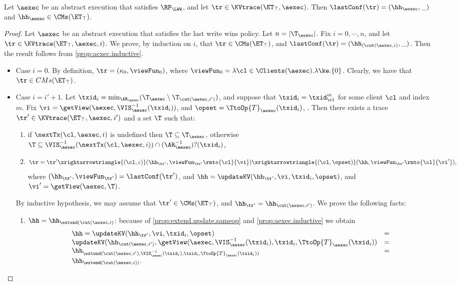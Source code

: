 \begin{proposition}
\label{prop:aexec2kvtrace}
Let $\aexec$ be an abstract execution that satisfies $\RP_{\LWW}$, 
and let $\tr \in \KVtrace(\ET_{\top}, \aexec)$. Then $\lastConf(\tr) = (\hh_{\aexec}, \_)$ and $\hh_{\aexec} \in \CMs(\ET_{\top})$. 
\end{proposition}
\begin{proof}
Let $\aexec$ be an abstract execution that satisfies the last write wins policy. 
Let $n = \lvert \T_{\aexec} \rvert$. Fix $i =0,\cdots, n$, 
and let $\tr \in \KVtrace(\ET_{\top}, \aexec, i)$. We prove, by 
induction on $i$, that $\tr \in \CMs(\ET_{\top})$, and 
$\lastConf(\tr) = (\hh_{(\cut(\aexec, i)}, \_)$. 
Then the result follows from  \cref{prop:aexec.inductive}.

\begin{itemize}
\item Case $i = 0$. By definition, $\tr = (\kappa_{0}, \viewFun_{0})$, 
where $\viewFun_{0} = \lambda \cl \in \Clients(\aexec). \lambda \ke.\{0\}$. 
Clearly, we have that $\tr \in CMs(\ET_{\top})$. 
\item Case $i = i'+1$. Let $\txid_{i} = \min_{\AR_{\aexec}}(\T_{\aexec} \setminus \T_{\cut(\aexec, i')})$, 
and suppose that $\txid_{i} = \txid_{\cl}^{m}$ for some client $\cl$ and index $m$. 
Fix $\vi = \getView(\aexec, \VIS_{\aexec}^{-1}(\txid_{i}))$, and  $\opset = \TtoOp{T}_{\aexec}(\txid_{i})$, . 
Then there exists a trace $\tr' \in \KVtrace(\ET_{\top}, \aexec, i')$ and a set 
$\T$ such that: 
\begin{enumerate}
\item if $\nextTx(\cl, \aexec, i)$ is undefined then $\T \subseteq \T_{\aexec}$, otherwise 
$\T \subseteq \VIS^{-1}_{\aexec}(\nextTx(\cl, \aexec, i)) \cap (\AR_{\aexec}^{-1})?(\txid_{i})$, 
\item
\[
\tr = \tr' \xrightarrowtriangle{(\cl, \varepsilon)} (\hh_{\tr'}, \viewFun_{\tr'}\rmto{\cl}{\vi}) \xrightarrowtriangle{(\cl, \opset)} 
(\hh,  \viewFun_{\tr'}\rmto{\cl}{\vi'}),
\]
where $(\hh_{\tr'}, \viewFun_{\tr'}) = \lastConf(\tr')$, and $\hh = \updateKV(\hh_{\tr'}, \vi, \txid_{i}, \opset)$, 
and $\vi' = \getView(\aexec, \T)$.
\end{enumerate}
By inductive hypothesis, we may assume that $\tr' \in \CMs(\ET_{\top})$, and $\hh_{\tr'} = \hh_{\cut(\aexec, i')}$. 
We prove the following facts: 
\begin{enumerate}
\item $\hh = \hh_{\extend(\cut(\aexec, i)}$: because of 
\ref{prop:extend.update.sameop} and \cref{prop:aexec.inductive} 
we obtain 
\[
\begin{array}{lr}
\hh = \updateKV(\hh_{\tr'}, \vi, \txid_{i}, \opset) &=\\ 
\updateKV(\hh_{\cut(\aexec, i')}, \getView(\aexec, \VIS^{-1}_{\aexec}(\txid_{i}), \txid_{i}, \TtoOp{T}_{\aexec}(\txid_{i})) &=\\
\hh_{\extend(\cut(\aexec, i'), \VIS^{-1}_{\aexec}(\txid_{i}), \txid_{i}, \TtoOp{T}_{\aexec}(\txid_{i})) }&=\\
\hh_{\extend(\cut(\aexec, i))}.
\end{array}
\]


\end{enumerate}
\end{itemize}
\end{proof}
